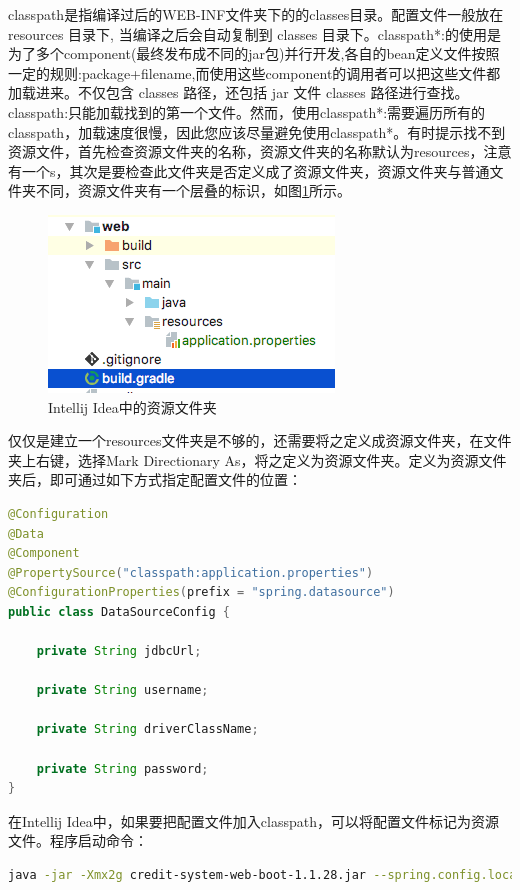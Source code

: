 \documentclass[11pt,fleqn]{book}
\numberwithin{dummy}{section}
\theoremstyle{ocrenumbox}
\theoremstyle{blacknumex}
\theoremstyle{blacknumbox}
\theoremstyle{ocrenum}
\begin{document}
classpath是指编译过后的WEB-INF文件夹下的的classes目录。配置文件一般放在 resources 目录下, 当编译之后会自动复制到 classes 目录下。classpath*:的使用是为了多个component(最终发布成不同的jar包)并行开发,各自的bean定义文件按照一定的规则:package+filename,而使用这些component的调用者可以把这些文件都加载进来。不仅包含 classes 路径，还包括 jar 文件 classes 路径进行查找。classpath:只能加载找到的第一个文件。然而，使用classpath*:需要遍历所有的classpath，加载速度很慢，因此您应该尽量避免使用classpath*。有时提示找不到资源文件，首先检查资源文件夹的名称，资源文件夹的名称默认为resources，注意有一个s，其次是要检查此文件夹是否定义成了资源文件夹，资源文件夹与普通文件夹不同，资源文件夹有一个层叠的标识，如图\ref{fig:javaresourcefolder}所示。

\begin{figure}[htbp]
	\centering
	\includegraphics[scale=0.8]{javaresourcefolder.png}
	\caption{Intellij Idea中的资源文件夹}
	\label{fig:javaresourcefolder}
\end{figure}

仅仅是建立一个resources文件夹是不够的，还需要将之定义成资源文件夹，在文件夹上右键，选择Mark Directionary As，将之定义为资源文件夹。定义为资源文件夹后，即可通过如下方式指定配置文件的位置：

\begin{lstlisting}[language=Java]
@Configuration
@Data
@Component
@PropertySource("classpath:application.properties")
@ConfigurationProperties(prefix = "spring.datasource")
public class DataSourceConfig {

	private String jdbcUrl;
	
	private String username;
	
	private String driverClassName;
	
	private String password;
}
\end{lstlisting}

在Intellij Idea中，如果要把配置文件加入classpath，可以将配置文件标记为资源文件。程序启动命令：

\begin{lstlisting}[language=Bash]
java -jar -Xmx2g credit-system-web-boot-1.1.28.jar --spring.config.location=application-jenkins.properties
\end{lstlisting}
\end{document}
